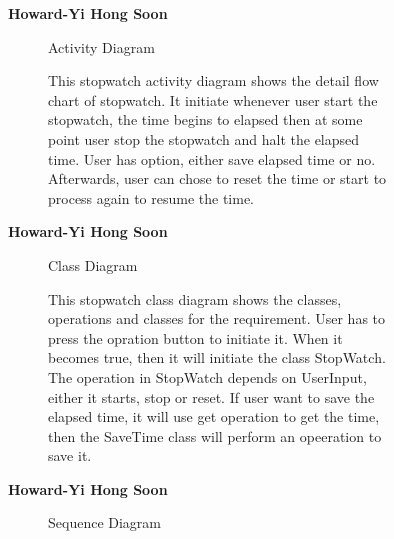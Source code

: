 \documentclass{article}
\begin{document}
		\begin{figure}[htbp]
			\textbf{Howard-Yi Hong Soon}
			\centering
			\begin{subfigure}{\textwidth}
				\resizebox{\textwidth}{!}{}
				\caption{Activity Diagram}
			\end{subfigure}
			\begin{subfigure}{\textwidth}
				This stopwatch activity diagram shows the detail flow chart of stopwatch. It initiate whenever user start the stopwatch, the time begins to elapsed
				then at some point user stop the stopwatch and halt the elapsed time. User has option, either save elapsed time or no. Afterwards, user can 
				chose to reset the time or start to process again to resume the time.
			\end{subfigure}
		\end{figure}
		\newpage
		

		\begin{figure}[htbp]
			\textbf{Howard-Yi Hong Soon}
			\centering
			\begin{subfigure}{\textwidth}
				\resizebox{\textwidth}{!}{}
				\caption{Class Diagram}
			\end{subfigure}
			\begin{subfigure}{\textwidth}
				This stopwatch class diagram shows the classes, operations and classes for the requirement. User has to press 
				the opration button to initiate it. When it becomes true, then it will initiate the class StopWatch. The operation in StopWatch depends on 
				UserInput, either it starts, stop or reset. If user want to save the elapsed time, it will use get operation to get the time,
				then the SaveTime class will perform an opeeration to save it. 
			\end{subfigure}
		\end{figure}
		

		\begin{figure}[htbp]
			\textbf{Howard-Yi Hong Soon}
			\centering
			\begin{subfigure}{\textwidth}
				\resizebox{\textwidth}{!}{}
				\caption{Sequence Diagram}
			\end{subfigure}
			\begin{subfigure}{\textwidth}

			\end{subfigure}
		\end{figure}
		\newpage
\end{document}
